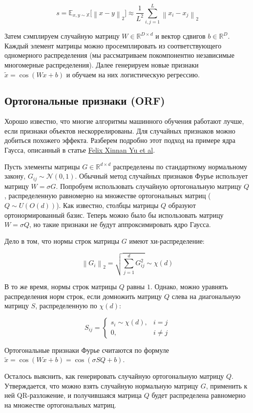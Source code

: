 \documentclass{article}
\newcommand{\bibref}[3]{#2\hyperlink{#1}{\color{blue}#3}}
\newcommand{\R}{\mathbb{R}}
\newcommand{\norm}[1]{\left\lVert#1\right\rVert}
\begin{document}
$$
s = \mathbb{E}_{x, y \sim \mathbb{X}} \Big[\norm{x - y}_2\Big] \approx \frac{1}{L^2} \sum_{i, j = 1}^L \norm{x_i - x_j}_2
$$

Затем сэмплируем случайную матрицу $W \in \R^{D \times d}$ и вектор сдвигов $b \in \R^D$. Каждый элемент матрицы можно просемплировать из соответствующего одномерного распределения (мы рассматриваем покомпонентно независимые многомерные распределения). Далее генерируем новые признаки $\widetilde{x} = \cos (Wx + b)$ и обучаем на них логистическую регрессию.

\subsection{Ортогональные признаки (ORF)}

Хорошо известно, что многие алгоритмы машинного обучения работают лучше, если признаки объектов нескоррелированы. Для случайных признаков можно добиться похожего эффекта. Разберем подробно этот подход на примере ядра Гаусса, описанный в статье \bibref{orf}{}{Felix Xinnan Yu et al}.

Пусть элементы матрицы $G \in \R^{d \times d}$ распределены по стандартному нормальному закону, $G_{ij} \sim \mathcal{N}(0, 1)$. Обычный метод случайных признаков Фурье использует матрицу $W = \sigma G$. Попробуем использовать случайную ортогональную матрицу $Q$, распределенную равномерно на множестве ортогональных матриц ($Q \sim U(O(d))$). Как известно, столбцы матрицы $Q$ образуют ортонормированный базис. Теперь можно было бы использовать матрицу $W = \sigma Q$, но такие признаки не будут аппроксимировать ядро Гаусса.

Дело в том, что нормы строк матрицы $G$ имеют хи-распределение:

$$
\norm{G_i}_2 = \sqrt{\sum_{j=1}^d G_{ij}^2} \sim \chi(d)
$$

\noindent
В то же время, нормы строк матрицы $Q$ равны $1$. Однако, можно уравнять распределения норм строк, если домножить матрицу $Q$ слева на диагональную матрицу $S$, распределенную по $\chi(d)$:

$$
S_{ij} = \begin{cases}
    s_i \sim \chi(d), & i = j \\
    0, & i \ne j
\end{cases}
$$

\noindent
Ортогональные признаки Фурье считаются по формуле $\widetilde{x} = \cos (Wx + b) = \cos (\sigma S Q + b)$.

Осталось выяснить, как генерировать случайную ортогональную матрицу $Q$. Утверждается, что можно взять случайную нормальную матрицу $G$, применить к ней QR-разложение, и получившаяся матрица $Q$ будет распределена равномерно на множестве ортогональных матриц.
\end{document}

